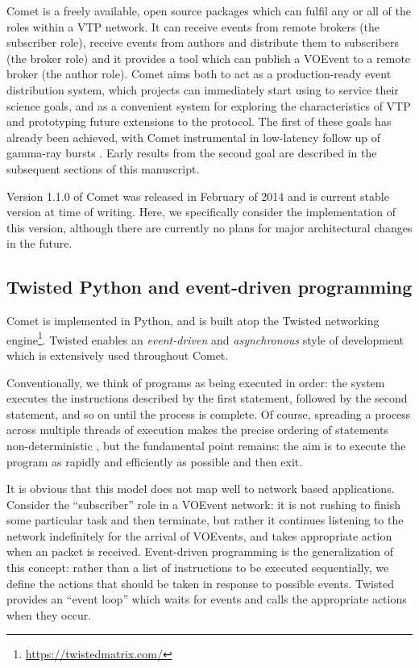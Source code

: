\documentclass[5p,authoryear]{elsarticle}
\begin{document}
Comet is a freely available, open source packages which can fulfil any or all
of the roles within a VTP network. It can receive events from remote brokers
(the subscriber role), receive events from authors and distribute them to
subscribers (the broker role) and it provides a tool which can publish a
VOEvent to a remote broker (the author role). Comet aims both to act as a
production-ready event distribution system, which projects can immediately
start using to service their science goals, and as a convenient system for
exploring the characteristics of VTP and prototyping future extensions to the
protocol. The first of these goals has already been achieved, with Comet
instrumental in low-latency follow up of gamma-ray bursts \citep{Staley:2013}.
Early results from the second goal are described in the subsequent sections of
this manuscript.

Version 1.1.0 of Comet was released in February of 2014 and is current stable
version at time of writing. Here, we specifically consider the implementation
of this version, although there are currently no plans for major architectural
changes in the future.

\subsection{Twisted Python and event-driven programming}
\label{sec:design:twisted}

Comet is implemented in Python, and is built atop the Twisted networking
engine\footnote{\url{https://twistedmatrix.com/}}. Twisted enables an
\textit{event-driven} and \textit{asynchronous} style of development which is
extensively used throughout Comet.

Conventionally, we think of programs as being executed in order: the system
executes the instructions described by the first statement, followed by the
second statement, and so on until the process is complete. Of course,
spreading a process across multiple threads of execution makes the precise
ordering of statements non-deterministic \citep[and, indeed, introduces a whole
new level of complexity in the process;][]{Lee:2006}, but the fundamental
point remains: the aim is to execute the program as rapidly and efficiently as
possible and then exit.

It is obvious that this model does not map well to network based applications.
Consider the ``subscriber'' role in a VOEvent network: it is not rushing to
finish some particular task and then terminate, but rather it continues
listening to the network indefinitely for the arrival of VOEvents, and takes
appropriate action when an packet is received. Event-driven programming is the
generalization of this concept: rather than a list of instructions to be
executed sequentially, we define the actions that should be taken in response
to possible events. Twisted provides an ``event loop'' which waits for events
and calls the appropriate actions when they occur.
\end{document}
